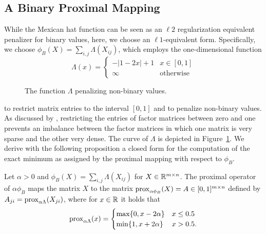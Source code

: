 \subsection{A Binary Proximal Mapping}\label{sec:PT:binprox}
While the Mexican hat function can be seen as an $\ell2$ regularization equivalent penalizer for binary values, here, we choose an $\ell1$-equivalent form.
Specifically, we choose $\phi_B(X)=\sum_{i,j}\Lambda(X_{ij})$, which employs the one-dimensional function 
\[
	\Lambda(x) = 
    \begin{cases}
        -|1-2x|+1 &x\in[0,1]\\
        \infty &\text{otherwise}
    \end{cases}
\]
\begin{figure}
\centering

\caption{The function $\Lambda$ penalizing non-binary values.}
\label{fig:lambda}
\end{figure}
to restrict matrix entries to the interval $[0,1]$ and to penalize non-binary values. As discussed by \cite{zhang2010binary}, restricting the entries of factor matrices between zero and one prevents an imbalance between the factor matrices in which one matrix is very sparse and the other very dense. The curve of $\Lambda$ is depicted  in Figure~\ref{fig:lambda}. 
We derive with the following proposition a closed form for the computation of the exact minimum as assigned by the proximal mapping with respect to $\phi_B$. 
\begin{theorem}
Let $\alpha>0$ and $\phi_B(X)=\sum_{i,j}\Lambda(X_{ij})$ for $X\in\mathbb{R}^{m\times n}$. The proximal operator of $\alpha\phi_B$ maps the matrix $X$ to the matrix $\operatorname{prox}_{\alpha\phi_B}(X)=A\in [0,1]^{m\times n}$ defined by $A_{ji}=\operatorname{prox}_{\alpha\Lambda}(X_{ji})$, where for $x\in \mathbb{R}$ it holds that
    \begin{equation}\label{eq:binprox}
	\operatorname{prox}_{\alpha \Lambda}(x)=
    \begin{cases}
        \max\{0,x-2\alpha\} &x\leq0.5\\
        \min\{1,x+2\alpha\} &x>0.5.
    \end{cases}
    \end{equation}
\end{theorem}
